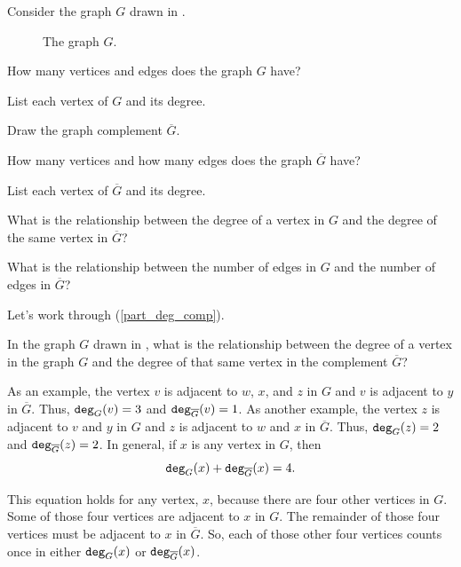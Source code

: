 \begin{act}
\label{act_graph_comp} 
    Consider the graph $G$ drawn in .

        \begin{figure}[hbtp]
            \centering
            
            \caption{The graph $G$.}
            \label{fig_graph_act_deg_comp}
        \end{figure}

        \begin{apart}
            \item How many vertices and edges does the graph $G$ have?
            \item List each vertex of $G$ and its degree.
            \item Draw the graph complement $\overline{G}$.
            \item How many vertices and how many edges does the graph $\overline{G}$ have?
            \item List each vertex of $\overline{G}$ and its degree.
            \item \label{part_deg_comp} What is the relationship between the degree of a vertex in $G$ and the degree of the same vertex in $\overline{G}$?
            \item \label{part_edge_comp} What is the relationship between the number of edges in $G$ and the number of edges in $\overline{G}$?
        \end{apart}
\end{act}

Let's work through  (\ref{part_deg_comp}).

\begin{exam}
\label{exam_deg_comp}
    In the graph $G$ drawn in , what is the relationship between the degree of a vertex in the graph $G$ and the degree of that same vertex in the complement $\overline{G}$?
        \begin{soln}
            As an example, the vertex $v$ is adjacent to $w$, $x$, and $z$ in $G$ and $v$ is adjacent to $y$ in $\overline{G}$.  Thus, $\texttt{deg}_G(v) = 3$ and $\texttt{deg}_{\overline{G}}(v) = 1$. As another example, the vertex $z$ is adjacent to $v$ and $y$ in $G$ and $z$ is adjacent to $w$ and $x$ in $\overline{G}$. Thus, $\texttt{deg}_G(z) = 2$ and $\texttt{deg}_{\overline{G}}(z) = 2$. In general, if $x$ is any vertex in $G$, then $$\texttt{deg}_G(x) +\texttt{deg}_{\overline{G}}(x) = 4.$$
            
            This equation holds for any vertex, $x$, because there are four other vertices in $G$.  Some of those four vertices are adjacent to $x$ in $G$.  The remainder of those four vertices must be adjacent to $x$ in $\overline{G}$.  So, each of those other four vertices counts once in either $\texttt{deg}_G(x)$ or $\texttt{deg}_{\overline{G}}(x)$.
        \end{soln}
\end{exam}



